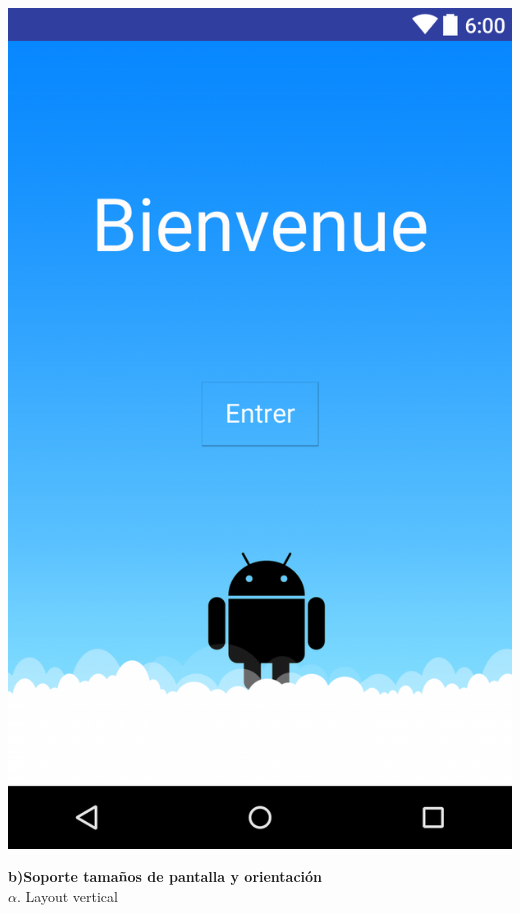 \documentclass{article}
\begin{document}
\begin{center}

\includegraphics[scale=.15]{layout-2016-04-17-Fra_lay.png} 

\end{center}

\newpage

\noindent \textbf{b)Soporte tama\~{n}os de pantalla y orientaci\'on}\\

$\alpha$. Layout vertical\
\end{document}
